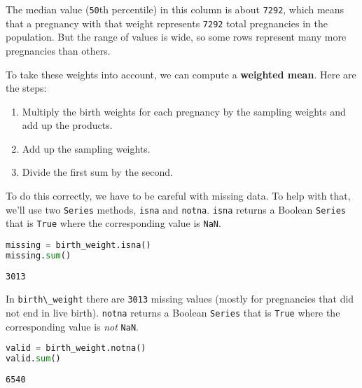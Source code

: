 The median value (\passthrough{\lstinline!50!}th percentile) in this
column is about \passthrough{\lstinline!7292!}, which means that a
pregnancy with that weight represents \passthrough{\lstinline!7292!}
total pregnancies in the population. But the range of values is wide, so
some rows represent many more pregnancies than others.

To take these weights into account, we can compute a \textbf{weighted
mean}. Here are the steps:

\begin{enumerate}
\def\labelenumi{\arabic{enumi}.}
\item
  Multiply the birth weights for each pregnancy by the sampling weights
  and add up the products.
\item
  Add up the sampling weights.
\item
  Divide the first sum by the second.
\end{enumerate}

To do this correctly, we have to be careful with missing data. To help
with that, we'll use two \passthrough{\lstinline!Series!} methods,
\passthrough{\lstinline!isna!} and \passthrough{\lstinline!notna!}.
\passthrough{\lstinline!isna!} returns a Boolean
\passthrough{\lstinline!Series!} that is \passthrough{\lstinline!True!}
where the corresponding value is \passthrough{\lstinline!NaN!}.

\begin{lstlisting}[language=Python,style=source]
missing = birth_weight.isna()
missing.sum()
\end{lstlisting}

\begin{lstlisting}[style=output]
3013
\end{lstlisting}

In \passthrough{\lstinline!birth\_weight!} there are
\passthrough{\lstinline!3013!} missing values (mostly for pregnancies
that did not end in live birth). \passthrough{\lstinline!notna!} returns
a Boolean \passthrough{\lstinline!Series!} that is
\passthrough{\lstinline!True!} where the corresponding value is
\emph{not} \passthrough{\lstinline!NaN!}.

\begin{lstlisting}[language=Python,style=source]
valid = birth_weight.notna()
valid.sum()
\end{lstlisting}

\begin{lstlisting}[style=output]
6540
\end{lstlisting}

